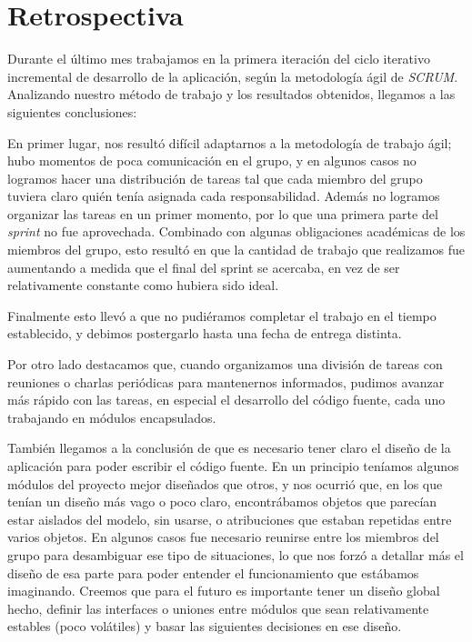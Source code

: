 \section{Retrospectiva} 


Durante el último mes trabajamos en la primera iteración del ciclo iterativo incremental de desarrollo de la aplicación, según la metodología ágil de \emph{SCRUM}. Analizando nuestro método de trabajo y los resultados obtenidos, llegamos a las siguientes conclusiones:

En primer lugar, nos resultó difícil adaptarnos a la metodología de trabajo ágil; hubo momentos de poca comunicación en el grupo, y en algunos casos no logramos hacer una distribución de tareas tal que cada miembro del grupo tuviera claro quién tenía asignada cada responsabilidad. Además no logramos organizar las tareas en un primer momento, por lo que una primera parte del \emph{sprint} no fue aprovechada. Combinado con algunas obligaciones académicas de los miembros del grupo, esto resultó en que la cantidad de trabajo que realizamos fue aumentando a medida que el final del sprint se acercaba, en vez de ser relativamente constante como hubiera sido ideal.

Finalmente esto llevó a que no pudiéramos completar el trabajo en el tiempo establecido, y debimos postergarlo hasta una fecha de entrega distinta.
\bigskip

Por otro lado destacamos que, cuando organizamos una división de tareas con reuniones o charlas periódicas para mantenernos informados, pudimos avanzar más rápido con las tareas, en especial el desarrollo del código fuente, cada uno trabajando en módulos encapsulados.

También llegamos a la conclusión de que es necesario tener claro el diseño de la aplicación para poder escribir el código fuente. En un principio teníamos algunos módulos del proyecto mejor diseñados que otros, y nos ocurrió que, en los que tenían un diseño más vago o poco claro, encontrábamos objetos que parecían estar aislados del modelo, sin usarse, o atribuciones que estaban repetidas entre varios objetos. En algunos casos fue necesario reunirse entre los miembros del grupo para desambiguar ese tipo de situaciones, lo que nos forzó a detallar más el diseño de esa parte para poder entender el funcionamiento que estábamos imaginando. Creemos que para el futuro es importante tener un diseño global hecho, definir las interfaces o uniones entre módulos que sean relativamente estables (poco volátiles) y basar las siguientes decisiones en ese diseño.
\bigskip

